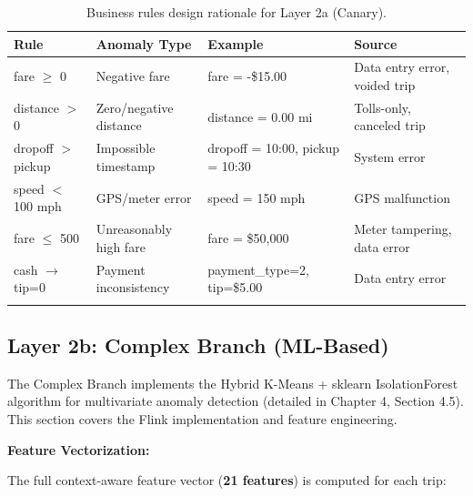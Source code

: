 \begin{longtable}{|m{2.5cm}|m{3.5cm}|m{4cm}|m{3.5cm}|}
\hline
\textbf{Rule} & \textbf{Anomaly Type} & \textbf{Example} & \textbf{Source} \\ \hline
fare $\geq$ 0 & Negative fare & fare = -\$15.00 & Data entry error, voided trip \\ \hline
distance $>$ 0 & Zero/negative distance & distance = 0.00 mi & Tolls-only, canceled trip \\ \hline
dropoff $>$ pickup & Impossible timestamp & dropoff = 10:00, pickup = 10:30 & System error \\ \hline
speed $<$ 100 mph & GPS/meter error & speed = 150 mph & GPS malfunction \\ \hline
fare $\leq$ 500 & Unreasonably high fare & fare = \$50,000 & Meter tampering, data error \\ \hline
cash $\to$ tip=0 & Payment inconsistency & payment\_type=2, tip=\$5.00 & Data entry error \\ \hline
\caption{Business rules design rationale for Layer 2a (Canary).}
\label{tab:business_rules_design}
\end{longtable}

\subsection{Layer 2b: Complex Branch (ML-Based)}

The Complex Branch implements the Hybrid K-Means + sklearn IsolationForest algorithm for multivariate anomaly detection (detailed in Chapter 4, Section 4.5). This section covers the Flink implementation and feature engineering.

\textbf{Feature Vectorization:}

The full context-aware feature vector (\textbf{21 features}) is computed for each trip:

